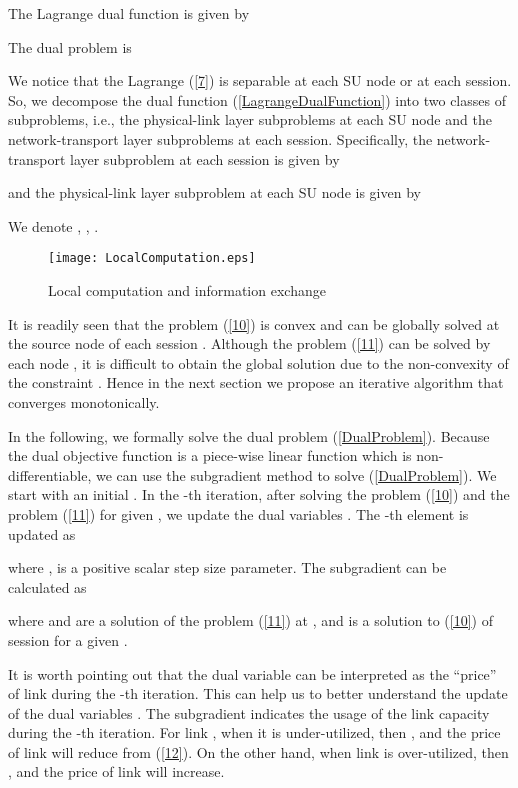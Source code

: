 \documentclass[12pt,onecolumn,tworows]{IEEEtran}
\begin{document}
The Lagrange dual function  is given by


The dual problem is


We notice that the Lagrange (\ref{7}) is separable at each SU node or at each session.
So, we decompose the dual function (\ref{LagrangeDualFunction}) into two classes of subproblems, i.e., the physical-link layer subproblems at each SU node and the network-transport layer subproblems at each session. Specifically, the network-transport layer subproblem at each session is given by

and the physical-link layer subproblem at each SU node is given by


We denote , , .




\begin{figure*}[t]
\centering
\texttt{[image: LocalComputation.eps]}
\caption{Local computation and information exchange}
\label{fig:fig1A}
\end{figure*}


 It is readily seen that the problem (\ref{10}) is convex and can be globally solved at the source node of each session . Although the problem (\ref{11}) can be solved by each node , it is difficult to obtain the global solution due to the non-convexity of the constraint . Hence in the next section we propose an iterative algorithm that converges monotonically.

In the following, we formally solve the dual problem (\ref{DualProblem}). Because the dual objective function is a piece-wise linear function which is non-differentiable, we can use the subgradient method to solve (\ref{DualProblem})\cite{boydcvbook}.
We start with an initial . In the -th iteration, after solving the problem (\ref{10}) and the problem (\ref{11}) for given , we update the dual variables . The -th element   is updated as

where ,  is a positive scalar step size parameter.
The subgradient  can be calculated as

where  and  are
a solution of the problem (\ref{11}) at , and  is a solution to (\ref{10}) of session  for a given .

It is worth pointing out that the dual variable  can be interpreted as the ``price'' of link  during the -th iteration. This can help us to better understand the update of the dual variables . The subgradient  indicates the usage of the link capacity during the -th iteration. For link , when it is under-utilized, then , and the price of link  will reduce from (\ref{12}). On the other hand, when link  is over-utilized, then , and the price of link  will increase.
\end{document}
